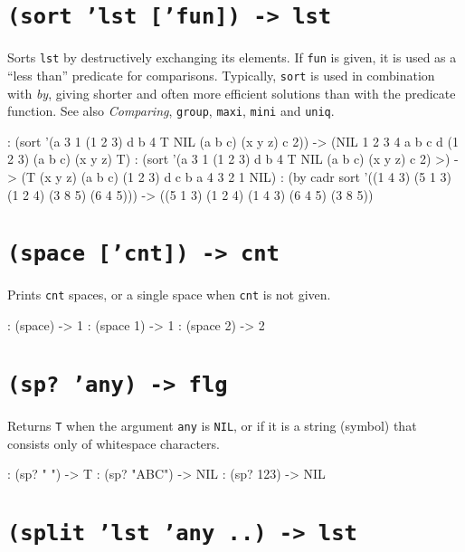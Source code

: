  
\section*{\texttt{(sort 'lst ['fun]) -> lst}}
\label{sec:func-ref-S-(sort 'lst ['fun]) -> lst}


Sorts \texttt{lst} by destructively exchanging its elements. If \texttt{fun} is given,
it is used as a ``less than'' predicate for comparisons. Typically, \texttt{sort}
is used in combination with \emph{by}, giving shorter and
often more efficient solutions than with the predicate function. See
also \emph{Comparing}, \texttt{group}, \texttt{maxi}, \texttt{mini} and \texttt{uniq}.


\begin{wideverbatim}
: (sort '(a 3 1 (1 2 3) d b 4 T NIL (a b c) (x y z) c 2))
-> (NIL 1 2 3 4 a b c d (1 2 3) (a b c) (x y z) T)
: (sort '(a 3 1 (1 2 3) d b 4 T NIL (a b c) (x y z) c 2) >)
-> (T (x y z) (a b c) (1 2 3) d c b a 4 3 2 1 NIL)
: (by cadr sort '((1 4 3) (5 1 3) (1 2 4) (3 8 5) (6 4 5)))
-> ((5 1 3) (1 2 4) (1 4 3) (6 4 5) (3 8 5))
\end{wideverbatim}

 
\section*{\texttt{(space ['cnt]) -> cnt}}
\label{sec:func-ref-S-(space ['cnt]) -> cnt}


Prints \texttt{cnt} spaces, or a single space when \texttt{cnt} is not given.


\begin{wideverbatim}
: (space)
 -> 1
: (space 1)
 -> 1
: (space 2)
  -> 2
\end{wideverbatim}

 
\section*{\texttt{(sp? 'any) -> flg}}
\label{sec:func-ref-S-(sp? 'any) -> flg}


Returns \texttt{T} when the argument \texttt{any} is \texttt{NIL}, or if it is a string
(symbol) that consists only of whitespace characters.


\begin{wideverbatim}
: (sp? "  ")
-> T
: (sp? "ABC")
-> NIL
: (sp? 123)
-> NIL
\end{wideverbatim}

 
\section*{\texttt{(split 'lst 'any ..) -> lst}}
\label{sec:func-ref-S-(split 'lst 'any ..) -> lst}


